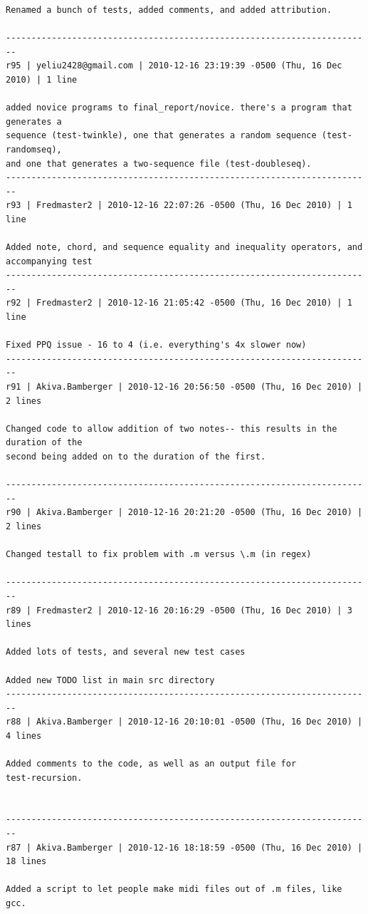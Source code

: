 \documentclass[12pt,A4]{book}
\begin{document}
\begin{verbatim}
Renamed a bunch of tests, added comments, and added attribution.

------------------------------------------------------------------------
r95 | yeliu2428@gmail.com | 2010-12-16 23:19:39 -0500 (Thu, 16 Dec 2010) | 1 line

added novice programs to final_report/novice. there's a program that generates a 
sequence (test-twinkle), one that generates a random sequence (test-randomseq), 
and one that generates a two-sequence file (test-doubleseq).
------------------------------------------------------------------------
r93 | Fredmaster2 | 2010-12-16 22:07:26 -0500 (Thu, 16 Dec 2010) | 1 line

Added note, chord, and sequence equality and inequality operators, and accompanying test
------------------------------------------------------------------------
r92 | Fredmaster2 | 2010-12-16 21:05:42 -0500 (Thu, 16 Dec 2010) | 1 line

Fixed PPQ issue - 16 to 4 (i.e. everything's 4x slower now)
------------------------------------------------------------------------
r91 | Akiva.Bamberger | 2010-12-16 20:56:50 -0500 (Thu, 16 Dec 2010) | 2 lines

Changed code to allow addition of two notes-- this results in the duration of the
second being added on to the duration of the first.

------------------------------------------------------------------------
r90 | Akiva.Bamberger | 2010-12-16 20:21:20 -0500 (Thu, 16 Dec 2010) | 2 lines

Changed testall to fix problem with .m versus \.m (in regex)

------------------------------------------------------------------------
r89 | Fredmaster2 | 2010-12-16 20:16:29 -0500 (Thu, 16 Dec 2010) | 3 lines

Added lots of tests, and several new test cases

Added new TODO list in main src directory
------------------------------------------------------------------------
r88 | Akiva.Bamberger | 2010-12-16 20:10:01 -0500 (Thu, 16 Dec 2010) | 4 lines

Added comments to the code, as well as an output file for
test-recursion.


------------------------------------------------------------------------
r87 | Akiva.Bamberger | 2010-12-16 18:18:59 -0500 (Thu, 16 Dec 2010) | 18 lines

Added a script to let people make midi files out of .m files, like gcc.


\end{verbatim}
\end{document}

